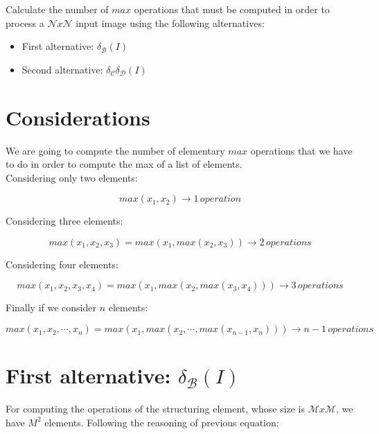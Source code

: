 \documentclass{article}
\begin{document}
Calculate the number of $max$ operations that must be computed in order to process a $\mathcal{N} x \mathcal{N}$ input image using the following alternatives:

\begin{itemize}
    \item First alternative: $\delta_{\mathcal{B}}(I)$
    \item Second alternative: $\delta_{\mathcal{C}}\delta_{\mathcal{D}}(I)$
\end{itemize}

\section{Considerations}

We are going to compute the number of elementary $max$ operations that we have to do in order to compute the max of a list of elements. \\

Considering only two elements:

\begin{equation}
    max(x_1, x_2) \rightarrow 1\, operation
\end{equation}

Considering three elements:

\begin{equation}
    max(x_1, x_2, x_3) = max(x_1, max(x_2, x_3)) \rightarrow 2\,operations
\end{equation}

Considering four elements:

\begin{equation}
    max(x_1, x_2, x_3, x_4) = max(x_1, max(x_2, max(x_3, x_4))) \rightarrow 3\,operations
\end{equation}

Finally if we consider $n$ elements:

\begin{equation}
    max(x_1, x_2, \cdots, x_n) = max(x_1, max(x_2, \cdots ,max(x_{n-1}, x_n))) \rightarrow n-1\,operations
\end{equation}

\section{First alternative: $\delta_{\mathcal{B}}(I)$}

For computing the operations of the structuring element, whose size is $\mathcal{M}x\mathcal{M}$, we have $M^2$ elements. Following the reasoning of previous equation:
\end{document}
